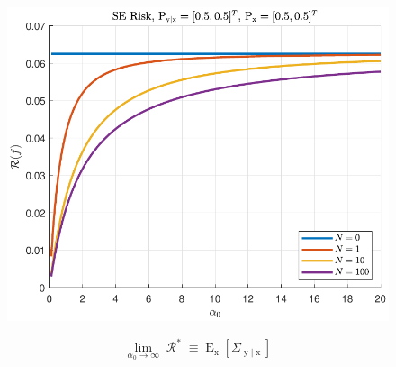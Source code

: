 \documentclass[aspectratio=169,usenames,dvipsnames]{beamer}
\DeclareMathOperator{\xrm}{\mathrm{x}}
\DeclareMathOperator{\yrm}{\mathrm{y}}
\DeclareMathOperator{\Erm}{\mathrm{E}}
\DeclareMathOperator{\Rcal}{\mathcal{R}}
\begin{document}
\begin{frame}
\begin{columns}[c]
\begin{column}{0.5\linewidth}
\begin{figure}
\centering
\includegraphics[width=0.9\linewidth]{Risk_SE_Dir_IO_a0_leg_N.pdf}
\end{figure}
%
\vspace{-0.25em}
\begin{equation*}
\lim_{\alpha_0 \to \infty} \Rcal^* \equiv \Erm_{\xrm} \left[ \Sigma_{\yrm | \xrm} \right]
\end{equation*}

\end{column}

\end{columns}

\end{frame}
\end{document}
